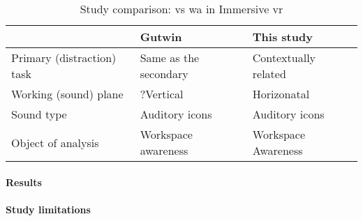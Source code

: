 \begin{table}[]
  \caption{Study comparison: \cite{gutwin_chalk_2011} vs \gls{wa} in Immersive \gls{vr}}
  \label{table:study_comp}
  \begin{tabular}{|l|l|l|}
  \hline
                             & Gutwin                & This study           \\ \hline
  Primary (distraction) task & Same as the secondary & Contextually related \\ \hline
  Working (sound) plane      & ?Vertical             & Horizonatal          \\ \hline
  Sound type                 & Auditory icons        & Auditory icons       \\ \hline
  Object of analysis         & Workspace awareness   & Workspace Awareness  \\ \hline
  \end{tabular}
\end{table}

\paragraph{Results}

\paragraph{Study limitations}
